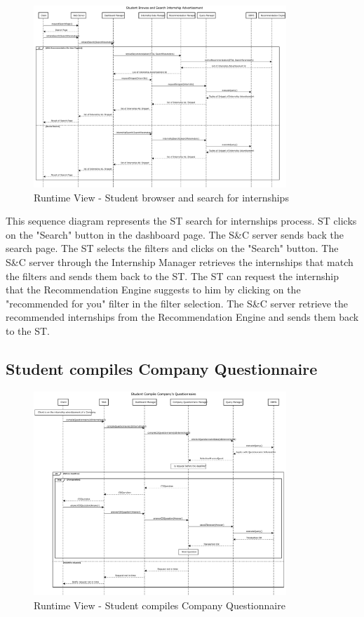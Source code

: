 \begin{figure}[H]
      \centering
      \includegraphics[width=0.85\textwidth]{Images/RV_03.pdf}
      \caption{Runtime View - Student browser and search for internships}
      \label{fig:rv-student-browser-and-search-for-internships}
\end{figure}

\par This sequence diagram represents the ST search for internships process. ST clicks on the "Search" button in the dashboard
page. The S\&C server sends back the search page. The ST selects the filters and clicks on the "Search" button. The S\&C server
through the Internship Manager retrieves the internships that match the filters and sends them back to the ST. The ST can
request the internship that the Recommendation Engine suggests to him by clicking on the "recommended for you" filter in the 
filter selection. The S\&C server retrieve the recommended internships from the Recommendation Engine and sends them back to the ST.

\subsection{Student compiles Company Questionnaire}

\begin{figure}[H]
      \centering
      \includegraphics[width=0.85\textwidth]{Images/RV_04a.pdf}
      \caption{Runtime View - Student compiles Company Questionnaire}
      \label{fig:rv-student-compiles-company-questionnaire}
\end{figure}

